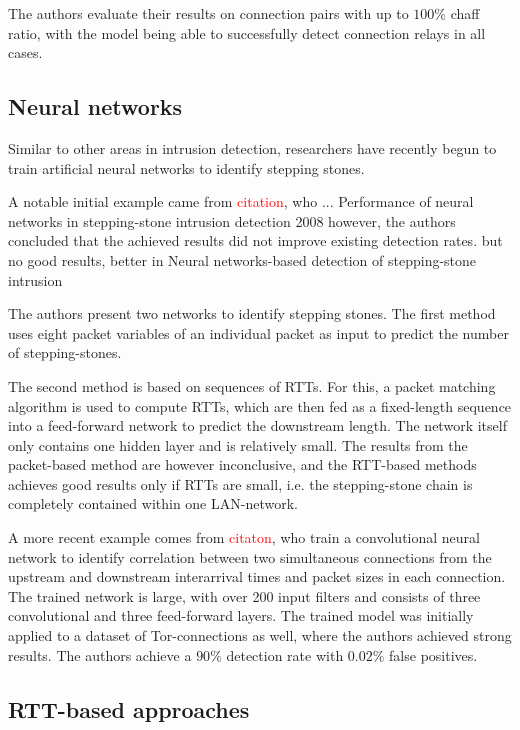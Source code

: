 \documentclass[conference]{IEEEtran}\usepackage[]{graphicx}\usepackage[]{color}
\begin{document}
The authors evaluate their results on connection pairs with up to $100\%$ chaff ratio, with the model being able to successfully detect connection relays in all cases. 


\subsection{Neural networks}

Similar to other areas in intrusion detection, researchers have recently begun to train artificial neural networks to identify stepping stones. 

A notable initial example came from \textcolor{red}{citation}, who ...
Performance of neural networks in stepping-stone intrusion detection 2008
however, the authors concluded that the achieved results did not improve existing detection rates. but no good results, better in Neural  networks-based  detection  of stepping-stone  intrusion

The authors present two networks to identify stepping stones. 
The first method uses eight packet variables of an individual packet as input to predict the number of stepping-stones.

The second method is based on sequences of RTTs. For this, a packet matching algorithm is used to compute RTTs, which are then fed as a fixed-length sequence into a feed-forward network to predict the downstream length. The network itself only contains one hidden layer and is relatively small. The results from the packet-based method are however inconclusive, and the RTT-based methods achieves good results only if RTTs are small, i.e. the stepping-stone chain is completely contained within one LAN-network.



A more recent example comes from \textcolor{red}{citaton}, who train a convolutional neural network to identify correlation between two simultaneous connections from the upstream and downstream interarrival times and packet sizes in each connection. The trained network is large, with over 200 input filters and consists of three convolutional and three feed-forward layers. The trained model was initially applied to a dataset of Tor-connections as well, where the authors achieved strong results. 
The authors achieve a $90\%$ detection rate with $0.02 \%$ false positives. 


\subsection{RTT-based approaches}
\end{document}
